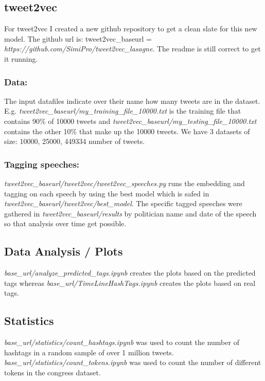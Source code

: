 \documentclass[10pt,conference,compsocconf]{IEEEtran}
\begin{document}
\subsection{tweet2vec}
For tweet2vec I created a new github repository to get a clean slate for this new model. The github url is: tweet2vec\_baseurl = \textit{https://github.com/SimiPro/tweet2vec\_lasagne}. The readme is still correct to get it running.
\subsubsection{Data:}
 The input datafiles indicate over their name how many tweets are in the dataset. E.g. \textit{tweet2vec\_baseurl/my\_training\_file\_10000.txt} is the training file that contains 90\% of 10000 tweets and \textit{tweet2vec\_baseurl/my\_testing\_file\_10000.txt} contains the other 10\% that make up the 10000 tweets. We have 3 datasets of size: 10000, 25000, 449334 number of tweets. 

\subsubsection{Tagging speeches:}
\textit{tweet2vec\_baseurl/tweet2vec/tweet2vec\_speeches.py} runs the embedding and tagging on each speech by using the best model which is safed in \textit{tweet2vec\_baseurl/tweet2vec/best\_model}. The specific tagged speeches were gathered in \textit{tweet2vec\_baseurl/results} by politician name and date of the speech so that analysis over time get possible.

\subsection{Data Analysis / Plots}
 \textit{base\_url/analyze\_predicted\_tags.ipynb} creates the plots based on the predicted tags whereas  \textit{base\_url/TimeLineHashTags.ipynb} creates the plots based on real tags. 
 
\subsection{Statistics}
\textit{base\_url/statistics/count\_hashtags.ipynb} was used to count the number of hashtags in a random sample of over 1 million tweets. 
\textit{base\_url/statistics/count\_tokens.ipynb} was used to count the number of different tokens in the congress dataset. 






\end{document}
